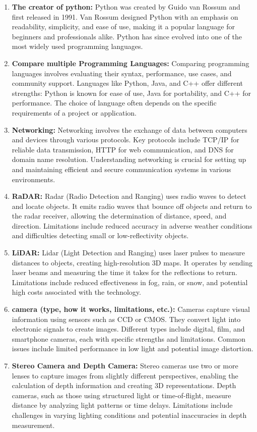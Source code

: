 \begin{enumerate}
    \item \textbf{The creator of python:} Python was created by Guido van Rossum and first released in 1991. Van Rossum designed Python with an emphasis on readability, simplicity, and ease of use, making it a popular language for beginners and professionals alike. Python has since evolved into one of the most widely used programming languages.
    \item \textbf{Compare multiple Programming Languages:} Comparing programming languages involves evaluating their syntax, performance, use cases, and community support. Languages like Python, Java, and C++ offer different strengths: Python is known for ease of use, Java for portability, and C++ for performance. The choice of language often depends on the specific requirements of a project or application.
    \item \textbf{Networking:} Networking involves the exchange of data between computers and devices through various protocols. Key protocols include TCP/IP for reliable data transmission, HTTP for web communication, and DNS for domain name resolution. Understanding networking is crucial for setting up and maintaining efficient and secure communication systems in various environments.
    \item \textbf{RaDAR:} Radar (Radio Detection and Ranging) uses radio waves to detect and locate objects. It emits radio waves that bounce off objects and return to the radar receiver, allowing the determination of distance, speed, and direction. Limitations include reduced accuracy in adverse weather conditions and difficulties detecting small or low-reflectivity objects.
    \item \textbf{LiDAR:} Lidar (Light Detection and Ranging) uses laser pulses to measure distances to objects, creating high-resolution 3D maps. It operates by sending laser beams and measuring the time it takes for the reflections to return. Limitations include reduced effectiveness in fog, rain, or snow, and potential high costs associated with the technology.
    \item \textbf{camera (type, how it works, limitations, etc.):} Cameras capture visual information using sensors such as CCD or CMOS. They convert light into electronic signals to create images. Different types include digital, film, and smartphone cameras, each with specific strengths and limitations. Common issues include limited performance in low light and potential image distortion.
    \item \textbf{Stereo Camera and Depth Camera:} Stereo cameras use two or more lenses to capture images from slightly different perspectives, enabling the calculation of depth information and creating 3D representations. Depth cameras, such as those using structured light or time-of-flight, measure distance by analyzing light patterns or time delays. Limitations include challenges in varying lighting conditions and potential inaccuracies in depth measurement.
\end{enumerate}